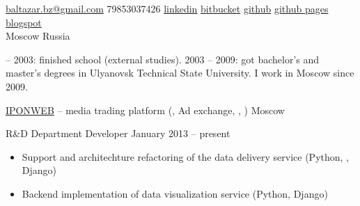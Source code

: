 \documentclass[unicode, 10pt, a4paper, oneside, fleqn]{article}
\begin{document}
\sloppy  %


\nobreakvspace{0.3em}  %

\noindent\href{mailto:baltazar.bz@gmail.com}{baltazar.bz\mbox{}@\mbox{}gmail.com}\sbull
\textsmaller{+}79853037426\sbull
\href{http://ru.linkedin.com/pub/yuri-bochkarev/21/3a9/555}{linkedin}
\sbull
\href{https://bitbucket.org/balta2ar}{bitbucket}
\sbull
\href{https://github.com/balta2ar}{github}
\sbull
\href{http://balta2ar.github.com}{github pages}
\sbull
\href{http://baltazar-bz.blogspot.com/}{blogspot}
\\
Moscow\sbull
Russia



 -- 2003: finished school (external studies).
2003 -- 2009: got bachelor's and master's degrees in Ulyanovsk Technical State
University. I work in Moscow since 2009.


\job  %
    {\href{http://www.iponweb.com}{IPONWEB} -- media trading platform
     (, Ad exchange, , )}
    {Moscow}
    {
        \position  %
            {R\&D Department Developer}
            {January 2013 -- present}
            {
                \begin{itemize}
                \item{Support and architechture refactoring of the data delivery
                      service (Python, , Django)}
                \item{Backend implementation of data visualization service
                      (Python, Django)}
                \end{itemize}
            }
    }
\end{document}
